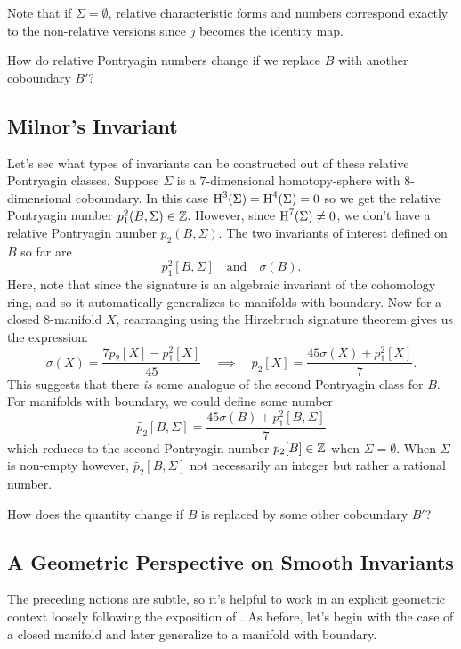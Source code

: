 \begin{remark}
  Note that if $\Sigma=\emptyset$, relative characteristic forms and numbers correspond exactly to the non-relative versions since $j$ becomes the identity map.
\end{remark}

How do relative Pontryagin numbers change if we replace $B$ with another coboundary $B'$?

\subsection*{Milnor's Invariant}

Let's see what types of invariants can be constructed out of these relative Pontryagin classes. Suppose $\Sigma$ is a $7$-dimensional homotopy-sphere with $8$-dimensional coboundary. In this case $\operatorname{H}^3(\Sigma)=\operatorname{H}^4(\Sigma)=0$ so we get the relative Pontryagin number $p_1^2(B, \Sigma)\in \mathbb{Z}$. However, since $\operatorname{H}^7(\Sigma)\neq 0$, we don't have a relative Pontryagin number $p_2(B, \Sigma)$. The two invariants of interest defined on $B$ so far are
\[
    p_1^2[B,\Sigma]
    \quad\textrm{and}\quad
    \sigma(B).
\]
Here, note that since the signature is an algebraic invariant of the cohomology ring, and so it automatically generalizes to manifolds with boundary.
Now for a closed $8$-manifold $X$, rearranging using the Hirzebruch signature theorem gives us the expression:
\[
  \sigma(X) = \frac{7p_2[X] - p_1^2[X]}{45}
  \quad\implies\quad
  p_2[X] = \frac{45\sigma(X) + p_1^2[X]}{7}.
\]
This suggests that there \emph{is} some analogue of the second Pontryagin class for $B$. For manifolds with boundary, we could define some number 
\[
  \widetilde{p_2}[B, \Sigma] = \frac{45\sigma(B) + p_1^2[B, \Sigma]}{7}
\]
which reduces to the second Pontryagin number $p_2[B]\in \mathbb{Z}$ when $\Sigma=\emptyset$. When $\Sigma$ is non-empty however, $\widetilde{p_2}[B,\Sigma]$ not necessarily an integer but rather a rational number.

How does the quantity change if $B$ is replaced by some other coboundary $B'$?


\subsection*{A Geometric Perspective on Smooth Invariants}

The preceding notions are subtle, so it's helpful to work in an explicit geometric context loosely following the exposition of \cite{witten1985global}. As before, let's begin with the case of a closed manifold and later generalize to a manifold with boundary.

